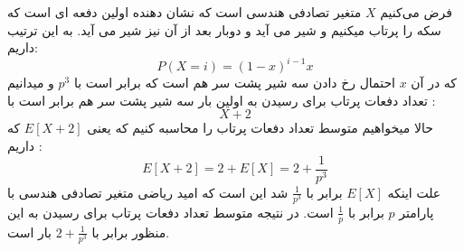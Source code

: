 \problem{}
فرض می‌کنیم \( X \) متغیر تصادفی هندسی است که 
نشان دهنده اولین دفعه ای است که سکه را پرتاب میکنیم و شیر می آید و دوبار بعد از آن نیز شیر می آید.
به این ترتیب داریم:
\[ P(X = i) = (1-x)^{i-1} x \]
که در آن $x$ احتمال رخ دادن سه شیر پشت سر هم است که برابر است با $p^3$
 و میدانیم تعداد دفعات پرتاب برای رسیدن به اولین بار سه شیر پشت سر هم برابر است با :
 \[ X+2 \] 
 حالا میخواهیم متوسط تعداد دفعات پرتاب را محاسبه کنیم که یعنی $E[X+2]$ که داریم :
\[ E[X+2] = 2+E[X] = 2 + \frac{1}{p^3} \] 
علت اینکه $E[X]$ برابر با $\frac{1}{p^3}$ شد این است که امید ریاضی متغیر تصادفی هندسی با پارامتر $p$ برابر با $\frac{1}{p}$ است.
در نتیجه متوسط تعداد دفعات پرتاب برای رسیدن به این منظور برابر با $2 + \frac{1}{p^3}$ بار است.